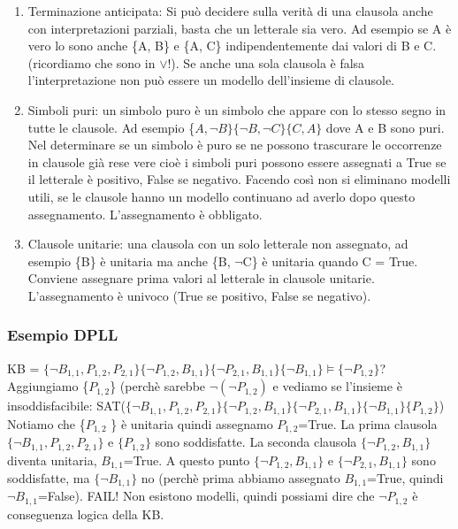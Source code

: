 \documentclass{article}
\begin{document}
\begin{enumerate}
    \item Terminazione anticipata: Si può decidere sulla verità di una clausola anche con interpretazioni parziali, basta che un letterale sia vero. Ad esempio se A è vero lo sono anche \{A, B\} e \{A, C\} indipendentemente dai valori di B e C. (ricordiamo che sono in $\lor$!). Se anche una sola clausola è falsa l'interpretazione non può essere un modello dell'insieme di clausole. 
    \item Simboli puri: un simbolo puro è un simbolo che appare con lo stesso segno in tutte le clausole. Ad esempio \{$A, \neg B\} \{ \neg B, \neg C\} \{C, A\}$ dove A e B sono puri. Nel determinare se un simbolo è puro se ne possono trascurare le occorrenze in clausole già rese vere cioè i simboli puri possono essere assegnati a True se il letterale è positivo, False se negativo. Facendo così non si eliminano modelli utili, se le clausole hanno un modello continuano ad averlo dopo questo assegnamento. L’assegnamento è obbligato.
    \item Clausole unitarie: una clausola con un solo letterale non assegnato, ad esempio \{B\} è unitaria ma anche \{B, $\neg$C\} è unitaria quando C = True. Conviene assegnare prima valori al letterale in clausole unitarie. L'assegnamento è univoco (True se positivo, False se negativo).
\end{enumerate}

\subsubsection{Esempio DPLL}
KB = $\{\neg B_{1,1}, P_{1,2}, P_{2,1}\} \{\neg P_{1,2}, B_{1,1}\} \{\neg P_{2,1}, B_{1,1}\} \{\neg B_{1,1}\} \models \{\neg P_{1,2} \}$? \newline
Aggiungiamo \{$P_{1,2}$\} (perchè sarebbe $\neg (\neg P_{1,2})$ e vediamo se l’insieme è insoddisfacibile: \newline 
SAT($\{\neg B_{1,1}, P_{1,2}, P_{2,1}\} \{\neg P_{1,2}, B_{1,1}\} \{\neg P_{2,1}, B_{1,1}\} \{\neg B_{1,1}\} \{P_{1,2} \}$) \newline
Notiamo che \{$P_{1,2}$ \} è unitaria quindi assegnamo $P_{1,2}$=True. \newline
La prima clausola $\{\neg B_{1,1}, P_{1,2}, P_{2,1}\}$ e  $\{P_{1,2} \}$ sono soddisfatte. \newline
La seconda clausola $\{\neg P_{1,2}, B_{1,1}\}$ diventa unitaria, $B_{1,1}$=True. A questo punto $\{\neg P_{1,2}, B_{1,1}\}$ e $\{\neg P_{2,1}, B_{1,1}\}$ sono soddisfatte, ma $\{\neg B_{1,1}\}$ no (perchè prima abbiamo assegnato $B_{1,1}$=True, quindi $\neg B_{1,1}$=False). FAIL! \newline 
Non esistono modelli, quindi possiami dire che $\neg P_{1,2}$ è conseguenza logica della KB.
\end{document}
